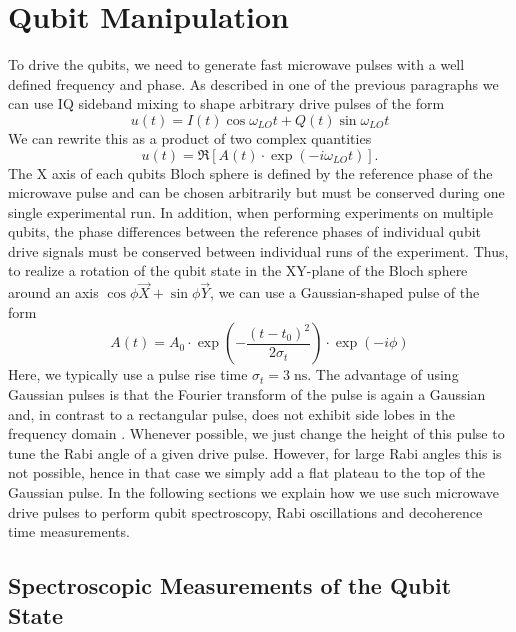 \section{Qubit Manipulation}

To drive the qubits, we need to generate fast microwave pulses with a well defined frequency and phase. As described in one of the previous paragraphs we can use IQ sideband mixing to shape arbitrary drive pulses of the form
%
\begin{equation}
u(t) = I(t)\cos{\omega_{LO}t}+Q(t)\sin{\omega_{LO}t}
\end{equation}
%
We can rewrite this as a product of two complex quantities
%
\begin{equation}
u(t) = \Re\left[ A(t)\cdot\exp{\left(-i\omega_{LO} t\right)}\right].
\end{equation}
%
The X axis of each qubits Bloch sphere is defined by the reference phase of the microwave pulse and can be chosen arbitrarily but must be conserved during one single experimental run. In addition, when performing experiments on multiple qubits, the phase differences between the reference phases of individual qubit drive signals must be conserved between individual runs of the experiment. Thus, to realize a rotation of the qubit state in the XY-plane of the Bloch sphere around an axis $\cos{\phi}\vec{X}+\sin{\phi}\vec{Y}$, we can use a Gaussian-shaped pulse of the form
%
\begin{equation}
A(t) = A_0\cdot\exp{\left(-\frac{(t-t_0)^2}{2\sigma_t}\right)}\cdot\exp{\left(-i\phi\right)}
\end{equation}
%
Here, we typically use a pulse rise time $\sigma_t=3\;\mathrm{ns}$. The advantage of using Gaussian pulses is that the Fourier transform of the pulse is again a Gaussian and, in contrast to a rectangular pulse, does not exhibit side lobes in the frequency domain \citep{bauer_gaussian_1984}. Whenever possible, we just change the height of this pulse to tune the Rabi angle of a given drive pulse. However, for large Rabi angles this is not possible, hence in that case we simply add a flat plateau to the top of the Gaussian pulse. In the following sections we explain how we use such microwave drive pulses to perform qubit spectroscopy, Rabi oscillations and decoherence time measurements.

\subsection{Spectroscopic Measurements of the Qubit State} \label{section:qubit_spectroscopy}

